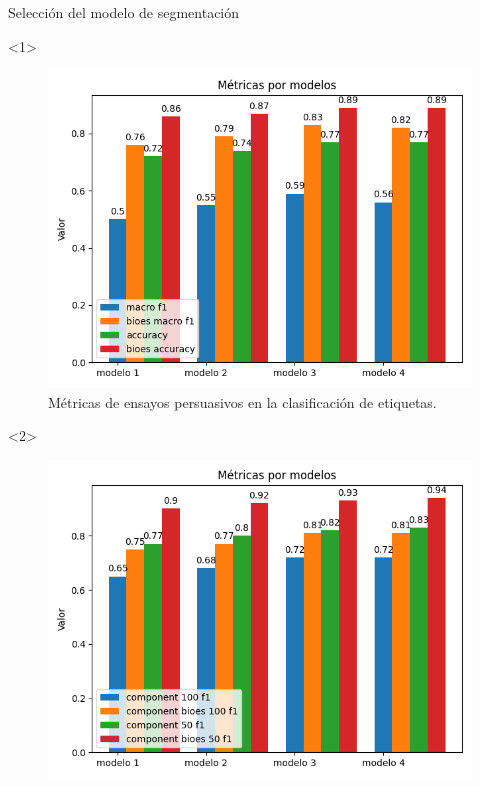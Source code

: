 \documentclass{beamer}
\begin{document}
\begin{frame}{Selección del modelo de segmentación}
    \begin{onlyenv}<1>
        \begin{figure}
            \includegraphics[scale=0.6]{Graphics/persuasive_essays_all_linked_macro_micro_metrics.png}
            \caption{Métricas de ensayos persuasivos en la clasificación de etiquetas.}
        \end{figure}
    \end{onlyenv}
    \begin{onlyenv}<2>
        \begin{figure}
            \includegraphics[scale=0.6]{Graphics/persuasive_essays_all_linked_components.png}

\end{figure}
\end{onlyenv}
\end{frame}
\end{document}
